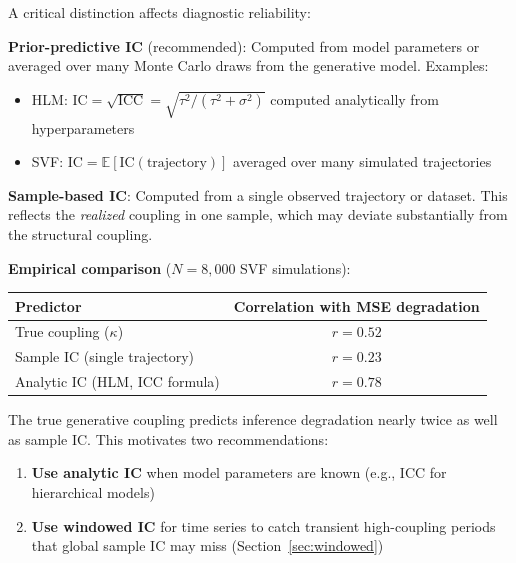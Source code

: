\documentclass[10pt]{article} %
\theoremstyle{plain}
\theoremstyle{definition}
\newcommand{\IC}{\mathrm{IC}}  %
\begin{document}
\begin{tcolorbox}[breakable, colback=green!5, colframe=green!50!black, title=\textbf{Prior-Predictive IC vs.\ Sample-Based IC}, fonttitle=\bfseries]
A critical distinction affects diagnostic reliability:

\textbf{Prior-predictive IC} (recommended): Computed from model parameters or averaged over many Monte Carlo draws from the generative model. Examples:
\begin{itemize}
    \item HLM: $\IC = \sqrt{\text{ICC}} = \sqrt{\tau^2 / (\tau^2 + \sigma^2)}$ computed analytically from hyperparameters
    \item SVF: $\IC = \mathbb{E}[\IC(\text{trajectory})]$ averaged over many simulated trajectories
\end{itemize}

\textbf{Sample-based IC}: Computed from a single observed trajectory or dataset. This reflects the \emph{realized} coupling in one sample, which may deviate substantially from the structural coupling.

\textbf{Empirical comparison} ($N = 8{,}000$ SVF simulations):
\begin{center}
\begin{tabular}{lc}
\toprule
Predictor & Correlation with MSE degradation \\
\midrule
True coupling ($\kappa$) & $r = 0.52$ \\
Sample IC (single trajectory) & $r = 0.23$ \\
Analytic IC (HLM, ICC formula) & $r = 0.78$ \\
\bottomrule
\end{tabular}
\end{center}

The true generative coupling predicts inference degradation nearly twice as well as sample IC. This motivates two recommendations:
\begin{enumerate}
    \item \textbf{Use analytic IC} when model parameters are known (e.g., ICC for hierarchical models)
    \item \textbf{Use windowed IC} for time series to catch transient high-coupling periods that global sample IC may miss (Section~\ref{sec:windowed})
\end{enumerate}
\end{tcolorbox}
\end{document}

